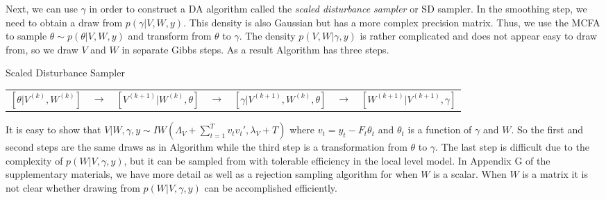 \documentclass[12pt]{article}
\begin{document}
Next, we can use $\gamma$ in order to construct a DA algorithm called the {\it scaled disturbance sampler} or SD sampler. In the smoothing step, we need to obtain a draw from $p(\gamma|V,W,y)$. This density is also Gaussian but has a more complex precision matrix. Thus, we use the MCFA to sample $\theta \sim p(\theta|V,W,y)$ and transform from $\theta$ to $\gamma$. The density $p(V,W|\gamma,y)$ is rather complicated and does not appear easy to draw from, so we draw $V$ and $W$ in separate Gibbs steps. As a result Algorithm  has three steps. 

\begin{alg*}[SD]Scaled Disturbance Sampler\label{alg:DLMdist}
{\small \vspace{-.5cm}
\begin{center}
\begin{tabular}{lllllll}
$[\theta|V^{(k)},W^{(k)}]$ & $\to$ & $[V^{(k+1)}|W^{(k)},\theta]$ & $\to$ & $[\gamma|V^{(k+1)},W^{(k)},\theta]$ & $\to$ & $[W^{(k+1)}|V^{(k+1)},\gamma]$
\end{tabular}
\end{center}
}
\end{alg*}
\noindent
It is easy to show that $V|W,\gamma,y \sim IW\left(\Lambda_V + \sum_{t=1}^Tv_tv_t',\lambda_V + T\right)$ where $v_t = y_t - F_t\theta_t$ and $\theta_t$ is a function of $\gamma$ and $W$. So the first and second steps are the same draws as in Algorithm  while the third step is a transformation from $\theta$ to $\gamma$. The last step is difficult due to the complexity of $p(W|V,\gamma,y)$, but it can be sampled from with tolerable efficiency in the local level model. In Appendix G of the supplementary materials, we have more detail as well as a rejection sampling algorithm for when $W$ is a scalar. When $W$ is a matrix it is not clear whether drawing from $p(W|V,\gamma,y)$ can be accomplished efficiently.
\end{document}
